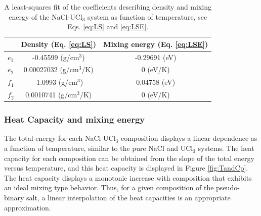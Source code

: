 \documentclass[preprint,3p,10pt,onecolumn,number,sort&compress]{elsarticle}
\begin{document}
{%


\begin{table}[hb!]
\centering
\begin{tabular}{lcc}
\hline
\hline
&Density (Eq. \ref{eq:LS}) &Mixing energy (Eq. \ref{eq:LSE}) \\
\hline
$e_1$ &-0.45599 (g/cm$^3$) &-0.29691 (eV) \\
$e_2$ &0.00027032 (g/cm$^3$/K) &0 (eV/K)\\
$f_1$ &-1.0993 (g/cm$^3$) &0.04758 (eV) \\
$f_2$ &0.0010741 (g/cm$^3$/K) &0 (eV/K)\\
\hline
\hline
\end{tabular}
\caption{A least-squares fit of the coefficients describing density and mixing energy of the NaCl-UCl$_3$ system as function of temperature, see Eqs. \ref{eq:LS} and \ref{eq:LSE}.}%
\label{table:LS}
\end{table}

\FloatBarrier

\subsubsection{Heat Capacity and mixing energy}
The total energy for each NaCl-UCl$_3$ composition displays a linear dependence as a function of temperature, similar to the pure NaCl and UCl$_3$ systems. The heat capacity for each composition can be obtained from the slope of the total energy versus temperature, and this heat capacity is displayed in Figure \ref{fig:TandCp}. The heat capacity displays a monotonic increase with composition that exhibits an ideal mixing type behavior. Thus, for a given composition of the pseudo-binary salt, a linear interpolation of the heat capacities is an appropriate approximation. 

}
\end{document}
